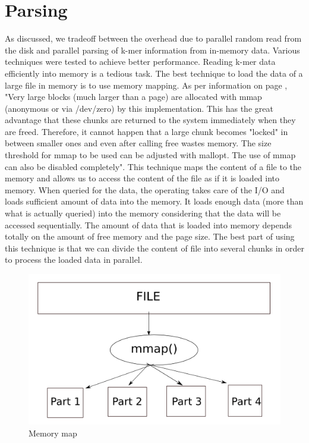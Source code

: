 \label{key}\documentclass[bachinf, english ,zihtitle,final,hyperref,utf8]{zihpub}
\begin{document}
\section{Parsing}
As discussed, we tradeoff between the overhead due to parallel random read from the disk and parallel parsing of k-mer information from in-memory data. Various techniques were tested to achieve better performance. Reading k-mer data efficiently into memory is a tedious task. The best technique to load the data of a large file in memory is to use memory mapping. 
As per information on page \cite{mmap}, "Very large blocks (much larger than a page) are allocated with mmap (anonymous or via /dev/zero) by this implementation. This has the great advantage that these chunks are returned to the system immediately when they are freed. Therefore, it cannot happen that a large chunk becomes "locked" in between smaller ones and even after calling free wastes memory. The size threshold for mmap to be used can be adjusted with mallopt. The use of mmap can also be disabled completely". This technique maps the content of a file to the memory and allows us to access the content of the file as if it is loaded into memory. When queried for the data, the operating takes care of the I/O and loads sufficient amount of data into the memory. It loads enough data (more than what is actually queried) into the memory considering that the data will be accessed sequentially. The amount of data that is loaded into memory depends totally on the amount of free memory and the page size. The best part of using this technique is that we can divide the content of file into several chunks in order to process the loaded data in parallel.
\begin{figure}[h]
\center
\includegraphics[scale=0.50]{mmapi}
\caption{Memory map}
\label{mmapid}
\end{figure}
\end{document}
